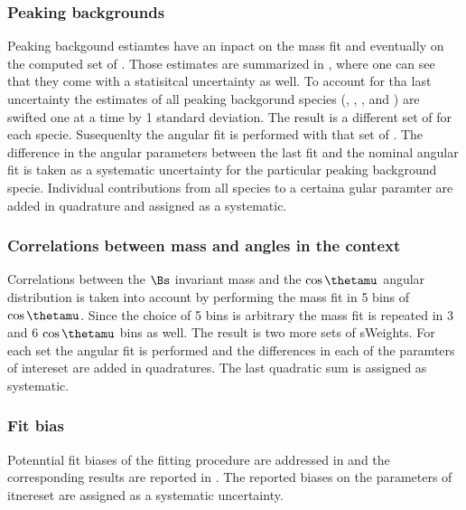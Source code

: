 \subsubsection{Peaking backgrounds}
\label{systPeakBkg}
Peaking backgound estiamtes have an inpact on the mass fit and eventually on the computed set of \sWeights.
Those estimates are summarized in , where one can see that they come with a statisitcal uncertainty as well.
To account for tha last uncertainty  the estimates of all peaking backgorund species (\BsJpsiKK, \BsJpsipipi, \BdJpsipipi, and \LbJpsipK)
are swifted one at a time by 1 standard deviation. The result is a different set of \sWeights for each specie.
Susequenlty the angular fit is performed with that set of \sWeights. The difference in the angular parameters
between the last fit and the nominal angular fit is taken as a systematic uncertainty for the particular peaking background specie.
Individual contributions from all species to a certaina gular paramter are added in quadrature and assigned as a systematic.

\subsubsection{Correlations between mass and angles in the \sPlot context}
\label{systCorrs}
Correlations between the $\Bs$ invariant mass and the $\cos\thetamu$ angular distribution is taken into account
by performing the mass fit in 5 bins of $\cos\thetamu$. Since the choice of 5 bins is arbitrary the mass fit is
repeated in 3 and 6 $\cos\thetamu$ bins as well. The result is two more sets of sWeights. For each set the angular
fit is performed and the differences in each of the paramters of intereset are added in quadratures. The last quadratic
sum is assigned as systematic. 

\subsubsection{Fit bias}
\label{systFitBias}
Potenntial fit biases of the fitting procedure are addressed in  and the corresponding 
results are reported in . The reported biases on the parameters of itnereset are assigned as a systematic uncertainty.

